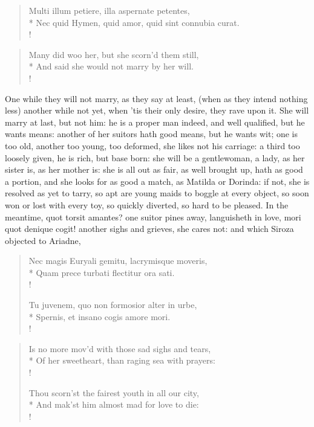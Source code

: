 \begin{latin}
\begin{verse}%
Multi illum petiere, illa aspernate petentes,\\*
Nec quid Hymen, quid amor, quid sint connubia curat.\\!
\end{verse}%
\end{latin}
\translationrule%
\begin{verse}%
Many did woo her, but she scorn'd them still,\\*
And said she would not marry by her will.\\!
\end{verse}%
%

One while they will not marry, as they say at least, (when as they
intend nothing less) another while not yet, when 'tis their only
desire, they rave upon it. She will marry at last, but not him: he is a
proper man indeed, and well qualified, but he wants means: another of
her suitors hath good means, but he wants wit; one is too old, another
too young, too deformed, she likes not his carriage: a third too
loosely given, he is rich, but base born: she will be a gentlewoman, a
lady, as her sister is, as her mother is: she is all out as fair, as
well brought up, hath as good a portion, and she looks for as good a
match, as Matilda or Dorinda: if not, she is resolved as yet to tarry,
so apt are young maids to boggle at every object, so soon won or lost
with every toy, so quickly diverted, so hard to be pleased. In the
meantime, quot torsit amantes? one suitor pines away, languisheth in
love, mori quot denique cogit! another sighs and grieves, she cares
not: and which Siroza objected to Ariadne,

\begin{latin}
\begin{verse}%
Nec magis Euryali gemitu, lacrymisque moveris,\\*
Quam prece turbati flectitur ora sati.\\!

Tu juvenem, quo non formosior alter in urbe,\\*
Spernis, et insano cogis amore mori.\\!
\end{verse}%
\end{latin}
\translationrule%
\begin{verse}%
Is no more mov'd with those sad sighs and tears,\\*
Of her sweetheart, than raging sea with prayers:\\!

Thou scorn'st the fairest youth in all our city,\\*
And mak'st him almost mad for love to die:\\!
\end{verse}%

